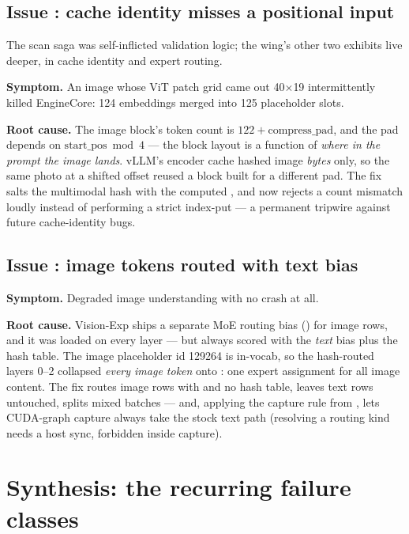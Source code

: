 \subsection{Issue : cache identity misses a positional input}

The scan saga was self-inflicted validation logic; the wing's other two
exhibits live deeper, in cache identity and expert routing.

\textbf{Symptom.} An image whose ViT patch grid came out 40$\times$19
intermittently killed EngineCore: 124 embeddings merged into 125 placeholder
slots.

\textbf{Root cause.} The image block's token count is
$122 + \mathrm{compress\_pad}$, and the pad depends on
$\mathrm{start\_pos} \bmod 4$ --- the block layout is a function of \emph{where
in the prompt the image lands}. vLLM's encoder cache hashed image \emph{bytes}
only, so the same photo at a shifted offset reused a block built for a
different pad. The fix salts the multimodal hash with the computed
, and  now rejects a count mismatch
loudly instead of performing a strict index-put --- a permanent tripwire
against future cache-identity bugs.

\subsection{Issue : image tokens routed with text bias}

\textbf{Symptom.} Degraded image understanding with no crash at all.

\textbf{Root cause.} Vision-Exp ships a separate MoE routing bias
() for image rows, and it was loaded on every
layer --- but  always scored with the \emph{text} bias
plus the  hash table. The image placeholder id 129264 is
in-vocab, so the hash-routed layers 0--2 collapsed \emph{every image token}
onto : one expert assignment for all image content. The
fix routes image rows with  and no hash table, leaves text rows
untouched, splits mixed batches --- and, applying the capture rule from
, lets CUDA-graph capture always take the stock text
path (resolving a routing kind needs a host sync, forbidden inside capture).

\section{Synthesis: the recurring failure classes}
\label{sec:bugs-synthesis}

